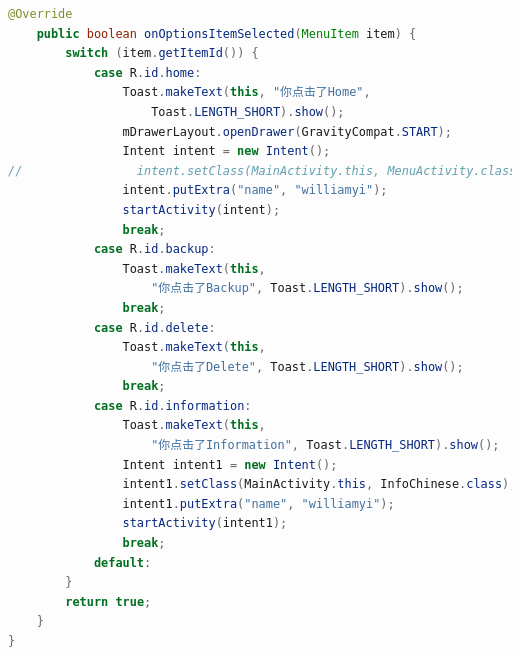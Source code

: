 \documentclass[UTF8, Microsoft YaHei]{book}
\begin{document}
\begin{small}
\begin{lstlisting}[language=java]
    @Override
    public boolean onOptionsItemSelected(MenuItem item) {
        switch (item.getItemId()) {
            case R.id.home:
                Toast.makeText(this, "你点击了Home",
                	Toast.LENGTH_SHORT).show();
                mDrawerLayout.openDrawer(GravityCompat.START);
                Intent intent = new Intent();
//                intent.setClass(MainActivity.this, MenuActivity.class);
                intent.putExtra("name", "williamyi");
                startActivity(intent);
                break;
            case R.id.backup:
                Toast.makeText(this,
                	"你点击了Backup", Toast.LENGTH_SHORT).show();
                break;
            case R.id.delete:
                Toast.makeText(this,
                	"你点击了Delete", Toast.LENGTH_SHORT).show();
                break;
            case R.id.information:
                Toast.makeText(this,
                	"你点击了Information", Toast.LENGTH_SHORT).show();
                Intent intent1 = new Intent();
                intent1.setClass(MainActivity.this, InfoChinese.class);
                intent1.putExtra("name", "williamyi");
                startActivity(intent1);
                break;
            default:
        }
        return true;
    }
}
\end{lstlisting}
\end{small}
\end{document}
